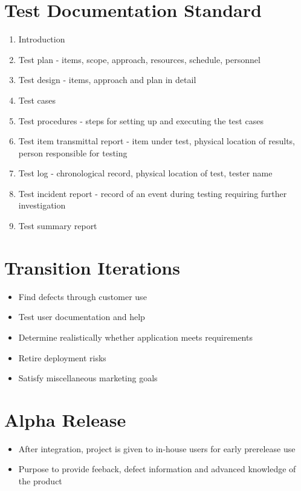 \documentclass{report}
\begin{document}
		\section{Test Documentation Standard}
		    \begin{enumerate}
		    	\item Introduction
		    	\item Test plan - items, scope, approach, resources, schedule, personnel
		    	\item Test design - items, approach and plan in detail
		    	\item Test cases
		    	\item Test procedures - steps for setting up and executing the test cases
		    	\item Test item transmittal report - item under test, physical location of results, person responsible for testing
		    	\item Test log - chronological record, physical location of test, tester name
		    	\item Test incident report - record of an event during testing requiring further investigation
		    	\item Test summary report
		    \end{enumerate}
		\section{Transition Iterations}
		    \begin{itemize}
		    	\item Find defects through customer use
		    	\item Test user documentation and help
		    	\item Determine realistically whether application meets requirements
		    	\item Retire deployment risks
		    	\item Satisfy miscellaneous marketing goals
		    \end{itemize}
		\section{Alpha Release}
		    \begin{itemize}
		    	\item After integration, project is given to in-house users for early prerelease use
		    	\item Purpose to provide feeback, defect information and advanced knowledge of the product
		    \end{itemize}
\end{document}
